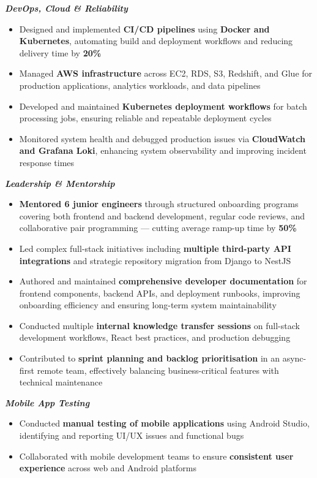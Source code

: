 \documentclass[a4paper,11.5pt]{article}
\newcommand{\h}[1]{\textbf{\textcolor{hgray}{#1}}}
\begin{document}
\vspace{0.25em}
\textit{\textbf{\textcolor{titlenavy}{\small DevOps, Cloud \& Reliability}}}
\begin{itemize}
  \item Designed and implemented \h{CI/CD pipelines} using \h{Docker and Kubernetes}, automating build and deployment workflows and reducing delivery time by \h{20\%}
  \item Managed \h{AWS infrastructure} across EC2, RDS, S3, Redshift, and Glue for production applications, analytics workloads, and data pipelines
  \item Developed and maintained \h{Kubernetes deployment workflows} for batch processing jobs, ensuring reliable and repeatable deployment cycles
  \item Monitored system health and debugged production issues via \h{CloudWatch and Grafana Loki}, enhancing system observability and improving incident response times
\end{itemize}

\vspace{0.25em}
\textit{\textbf{\textcolor{titlenavy}{\small Leadership \& Mentorship}}}
\begin{itemize}
  \item \h{Mentored 6 junior engineers} through structured onboarding programs covering both frontend and backend development, regular code reviews, and collaborative pair programming — cutting average ramp-up time by \h{50\%}
  \item Led complex full-stack initiatives including \h{multiple third-party API integrations} and strategic repository migration from Django to NestJS
  \item Authored and maintained \h{comprehensive developer documentation} for frontend components, backend APIs, and deployment runbooks, improving onboarding efficiency and ensuring long-term system maintainability
  \item Conducted multiple \h{internal knowledge transfer sessions} on full-stack development workflows, React best practices, and production debugging
  \item Contributed to \h{sprint planning and backlog prioritisation} in an async-first remote team, effectively balancing business-critical features with technical maintenance
\end{itemize}

\vspace{0.25em}
\textit{\textbf{\textcolor{titlenavy}{\small Mobile App Testing}}}
\begin{itemize}
  \item Conducted \h{manual testing of mobile applications} using Android Studio, identifying and reporting UI/UX issues and functional bugs
  \item Collaborated with mobile development teams to ensure \h{consistent user experience} across web and Android platforms
\end{itemize}
\end{document}
